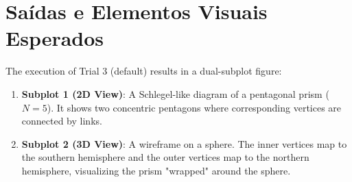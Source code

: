 \section{Saídas e Elementos Visuais Esperados}

The execution of Trial 3 (default) results in a dual-subplot figure:



\begin{enumerate}
    \item \textbf{Subplot 1 (2D View)}: A Schlegel-like diagram of a pentagonal prism ($N=5$). It shows two concentric pentagons where corresponding vertices are connected by links.
    \item \textbf{Subplot 2 (3D View)}: A wireframe on a sphere. The inner vertices map to the southern hemisphere and the outer vertices map to the northern hemisphere, visualizing the prism "wrapped" around the sphere.
\end{enumerate}
